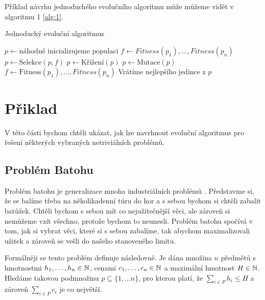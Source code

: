 Příklad návrhu jednoduchého evolučního algoritmu může můžeme vidět v algoritmu 1 \ref{alg:1}.

\begin{algorithm}
\caption{Jednoduchý evoluční algoritmus}
\begin{algorithmic}[1] 
	\State $p \gets \mbox{náhodně inicializujeme populaci}$
    \State $f \gets Fitness(p_1), \dots, Fitness(p_n)$ 
		\State $p \gets \mbox{Selekce}(p, f)$
		\State $p \gets \mbox{Křížení}(p)$
		\State $p \gets \mbox{Mutace}(p)$
        \State $f \gets \mbox{Fitness}(p_1), \dots, Fitness(p_n)$
    \EndWhile
    \State Vrátíme nejlepšího jedince z $p$
\EndFunction
\label{alg:1}
\end{algorithmic}
\end{algorithm}


\section{Přiklad}

V této části bychom chtěli ukázat, jak lze navrhnout evoluční algoritmus pro řešení některých vybraných netriviálních problémů.

\subsection{Problém Batohu}

Problém batohu je generalizace mnoha industriálních problémů \cite{EibenSmith2015}. Představme si, že se balíme třeba na několikadenní túru do hor a s sebou bychom si chtěli zabalit batůžek. Chtěli bychom s sebou mít co nejužitečnější věci, ale zároveň si nemůžeme vzít všechno, protože bychom to neunesli. Problém batohu spočívá v tom, jak si vybrat věci, které si s sebou zabalíme, tak abychom maximalizovali užitek a zároveň se vešli do našeho stanoveného limitu.

Formálněji se tento problém definuje následovně. Je dána množina $n$ předmětů s hmotnostmi $h_1, \dots, h_n \in \mathbb{N}$, cenami $c_1, \dots, c_n \in \mathbb{N}$ a maximální hmotnost $H \in \mathbb{N}$. Hledáme takovou podmnožinu $p \subseteq \{1, \dots n\}$, pro kterou platí, že $\sum_{i \in P} h_i \leq H$ a zároveň $\sum_{i \in P} c_i$ je co největší.

